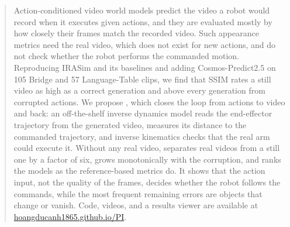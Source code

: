 \begin{abstract}
Action-conditioned video world models predict the video a robot would record when it executes given actions, and they are evaluated mostly by how closely their frames match the recorded video.
Such appearance metrics need the real video, which does not exist for new actions, and do not check whether the robot performs the commanded motion.
Reproducing IRASim and its baselines and adding Cosmos-Predict2.5 on 105 Bridge and 57 Language-Table clips, we find that SSIM rates a still video as high as a correct generation and above every generation from corrupted actions.
We propose \ours{}, which closes the loop from actions to video and back: an off-the-shelf inverse dynamics model reads the end-effector trajectory from the generated video, \ours{} measures its distance to the commanded trajectory, and inverse kinematics checks that the real arm could execute it.
Without any real video, \ours{} separates real videos from a still one by a factor of six, grows monotonically with the corruption, and ranks the models as the reference-based metrics do.
It shows that the action input, not the quality of the frames, decides whether the robot follows the commands, while the most frequent remaining errors are objects that change or vanish.
Code, videos, and a results viewer are available at \href{https://hoangducanh1865.github.io/PI/}{hoangducanh1865.github.io/PI}.
\end{abstract}

